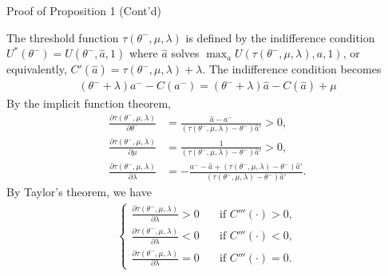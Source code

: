 \documentclass[9pt]{beamer}
\begin{document}
\begin{frame}{Proof of Proposition 1 (Cont'd)}

The threshold function $\tau(\theta^-,\mu,\lambda)$ is defined by the indifference condition $U^*(\theta^-)= U(\theta^-,\hat{a},1)$ where $\hat{a}$ solves $\max_aU(\tau(\theta^-,\mu,\lambda),a,1)$, or equivalently, $C'(\hat{a}) = \tau(\theta^-,\mu,\lambda)+\lambda$. The indifference condition becomes
\begin{align*}
    (\theta^-+\lambda)a^- - C(a^-) = (\theta^-+\lambda)\hat{a} - C(\hat{a})+\mu 
\end{align*}
By the implicit function theorem, 
\begin{align*}
    \frac{\partial \tau(\theta^-,\mu,\lambda)}{\partial \theta^-} &= \frac{\hat{a}- a^-}{(\tau(\theta^-,\mu,\lambda) - \theta^-)\hat{a}'}>0,\\
    \frac{\partial \tau(\theta^-,\mu,\lambda)}{\partial \mu} &= \frac{1}{(\tau(\theta^-,\mu,\lambda) - \theta^-)\hat{a}'}>0,\\
    \frac{\partial \tau(\theta^-,\mu,\lambda)}{\partial \lambda} &= -\frac{a^--\hat{a} +(\tau(\theta^-,\mu,\lambda)-\theta^-)\hat{a}'}{(\tau(\theta^-,\mu,\lambda) - \theta^-)\hat{a}'}.
\end{align*}
By Taylor's theorem, we have 
\begin{align*} 
    \begin{cases}
        \frac{\partial \tau(\theta^-,\mu,\lambda)}{\partial \lambda}>0\quad &\text{if }C'''(\cdot)>0,\\
        \frac{\partial \tau(\theta^-,\mu,\lambda)}{\partial \lambda}<0\quad &\text{if }C'''(\cdot)<0,\\
        \frac{\partial \tau(\theta^-,\mu,\lambda)}{\partial \lambda}=0\quad &\text{if }C'''(\cdot)=0.
    \end{cases}
\end{align*}

\vspace{1em}
\hyperlink{prop1}{}
	
\end{frame}
\end{document}
